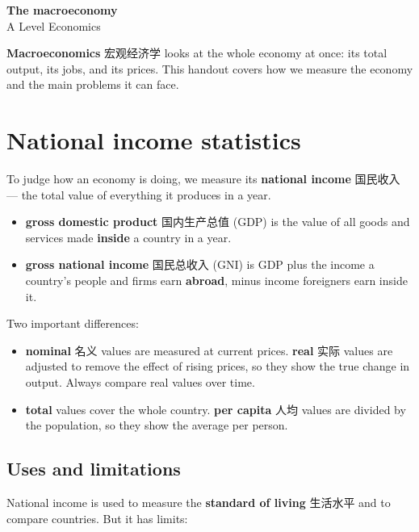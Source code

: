 \documentclass[11pt]{article}
\begin{document}
\begin{center}
  {\LARGE\bfseries The macroeconomy}\\[0.35em]
  {\large A Level Economics}
\end{center}
\vspace{0.6em}

\textbf{Macroeconomics} 宏观经济学 looks at the whole economy at once: its total output, its jobs, and its prices. This handout covers how we measure the economy and the main problems it can face.

\section*{National income statistics}

To judge how an economy is doing, we measure its \textbf{national income} 国民收入 — the total value of everything it produces in a year.

\begin{itemize}
\item \textbf{gross domestic product} 国内生产总值 (GDP) is the value of all goods and services made \textbf{inside} a country in a year.

\item \textbf{gross national income} 国民总收入 (GNI) is GDP plus the income a country's people and firms earn \textbf{abroad}, minus income foreigners earn inside it.

\end{itemize}

Two important differences:

\begin{itemize}
\item \textbf{nominal} 名义 values are measured at current prices. \textbf{real} 实际 values are adjusted to remove the effect of rising prices, so they show the true change in output. Always compare real values over time.

\item \textbf{total} values cover the whole country. \textbf{per capita} 人均 values are divided by the population, so they show the average per person.

\end{itemize}

\subsection*{Uses and limitations}

National income is used to measure the \textbf{standard of living} 生活水平 and to compare countries. But it has limits:
\end{document}

